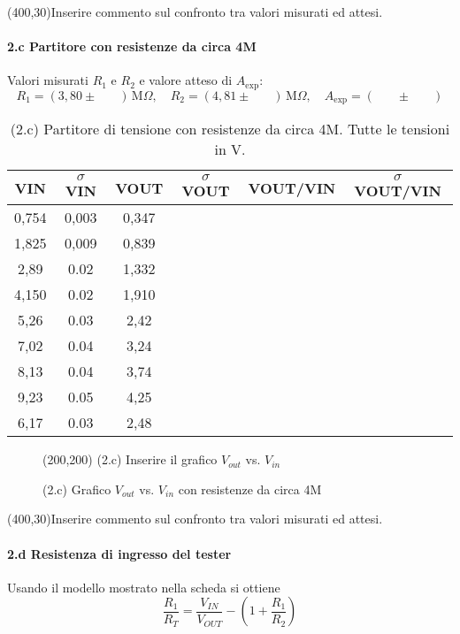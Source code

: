 \documentclass[10pt,a4paper]{article}
\newcommand{\exn}{\phantom{xxx}}
\begin{document}
\framebox(400,30){Inserire commento sul confronto tra valori misurati ed attesi.}


\paragraph{2.c Partitore con resistenze da circa 4M}
Valori misurati $R_1$ e $R_2$ e valore atteso di $A_\mathrm{exp}$:
\[
R_1 = ( 3,80 \pm \exn ) \,\mathrm{M}\Omega, \quad
R_2 = ( 4,81 \pm \exn ) \,\mathrm{M}\Omega, \quad
A_\mathrm{exp} = ( \exn \pm \exn ) 
\]


\begin{table}[h]
\centering
\begin{tabular}{|c|c|c|c|c|c|}
\hline 
VIN& $\sigma$ VIN  &VOUT	 & $\sigma$ VOUT& VOUT/VIN & $\sigma$ VOUT/VIN \\
\hline 
0,754 & 0,003 & 0,347 & \exn & \exn &\exn \\
1,825 & 0,009 & 0,839 & \exn & \exn &\exn \\
2,89 & 0.02 & 1,332 & \exn & \exn &\exn \\
4,150 & 0.02 & 1,910 & \exn & \exn &\exn \\
5,26 & 0.03 & 2,42 & \exn & \exn &\exn \\
7,02 & 0.04 & 3,24 & \exn & \exn &\exn \\
8,13 & 0.04 & 3,74 & \exn & \exn &\exn \\
9,23 & 0.05 & 4,25 & \exn & \exn &\exn \\
6,17 & 0.03 & 2,48 & \exn & \exn &\exn \\
\hline 
\end{tabular} 
\caption{(2.c) Partitore di tensione con resistenze da circa 4M. Tutte le tensioni in V.\label{t:par2}}
\end{table}


\begin{figure}[h]
\centering
\framebox(200,200){ (2.c) Inserire il grafico $V_{out}$ vs. $V_{in}$ }

\caption{(2.c) Grafico $V_{out}$ vs. $V_{in}$ con resistenze da circa 4M \label{f:par2}}
\end{figure}

\framebox(400,30){Inserire commento sul confronto tra valori misurati ed attesi.}



\paragraph{2.d Resistenza di ingresso del tester}
Usando il modello mostrato nella scheda si ottiene
\[ \frac{R_1}{R_T} =  \frac{V_{IN}}{V_{OUT}} - (1 +  \frac{R_1}{R_2} )
\]
\end{document}
